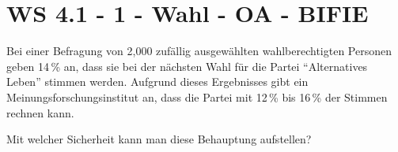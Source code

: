 \section{WS 4.1 - 1 - Wahl - OA - BIFIE}

\begin{beispiel}[WS 4.1]{1}
Bei einer Befragung von 2,000 zufällig ausgewählten wahlberechtigten Personen geben 14\,\%
an, dass sie bei der nächsten Wahl für die Partei "`Alternatives Leben"' stimmen werden. Aufgrund dieses Ergebnisses gibt ein Meinungsforschungsinstitut an, dass die Partei mit 12\,\% bis 16\,\% der Stimmen rechnen kann.  

\leer

Mit welcher Sicherheit kann man diese Behauptung aufstellen? \\

\end{beispiel}